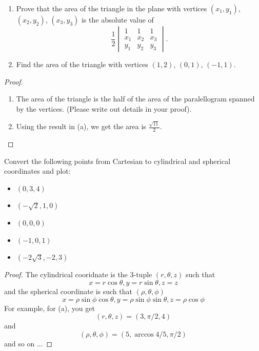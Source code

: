\documentclass[openany]{book}
\begin{document}
\begin{prob}[27]
    \begin{enumerate}
        \item[(a)] Prove that the area of the triangle in the plane with vertices \((x_1, y_1)\), \((x_2, y_2)\), \((x_3, y_3)\) is the absolute value of  
        \[
            \frac{1}{2} \begin{vmatrix}
            1 & 1 & 1 \\
            x_1 & x_2 & x_3 \\
            y_1 & y_2 & y_3
            \end{vmatrix}.
        \]
        \item[(b)] Find the area of the triangle with vertices \((1, 2)\), \((0, 1)\), \((-1, 1)\).
    \end{enumerate}
\end{prob}
\begin{proof}
    \begin{enumerate}
        \item[(a)] The area of the triangle is the half of the area of the paralellogram spanned by the vertices. (Please write out details in your proof).
        \item[(b)] Using the result in (a), we get the area is $\frac{\sqrt{11}}{2}$.
    \end{enumerate}
\end{proof}


\begin{prob}[28]
    Convert the following points from Cartesian to cylindrical and spherical coordinates and plot:  

    \begin{itemize}
        \item[(a)] \((0, 3, 4)\)
        \item[(b)] \((-\sqrt{2}, 1, 0)\)
        \item[(c)] \((0, 0, 0)\)
        \item[(d)] \((-1, 0, 1)\)
        \item[(e)] \((-2\sqrt{3}, -2, 3)\)
    \end{itemize}
\end{prob}
\begin{proof}
    The cylindrical cooridnate is the $3$-tuple $(r,\theta, z)$ such that 
    \begin{equation*}
        x=r\cos\theta, y=r\sin\theta, z=z
    \end{equation*}
    and the spherical coordinate is such that $(\rho,\theta,\phi)$
    \begin{equation*}
        x=\rho\sin\phi\cos\theta, y=\rho\sin\phi\sin\theta, z=\rho\cos\phi
    \end{equation*}
    For example, for (a), you get 
    \begin{equation*}
        (r,\theta, z)=(3, \pi/2, 4)
    \end{equation*}
    and 
    \begin{equation*}
        (\rho,\theta,\phi)=(5, \arccos 4/5, \pi/2)
    \end{equation*}
    and so on $\dots$
\end{proof}
\end{document}

